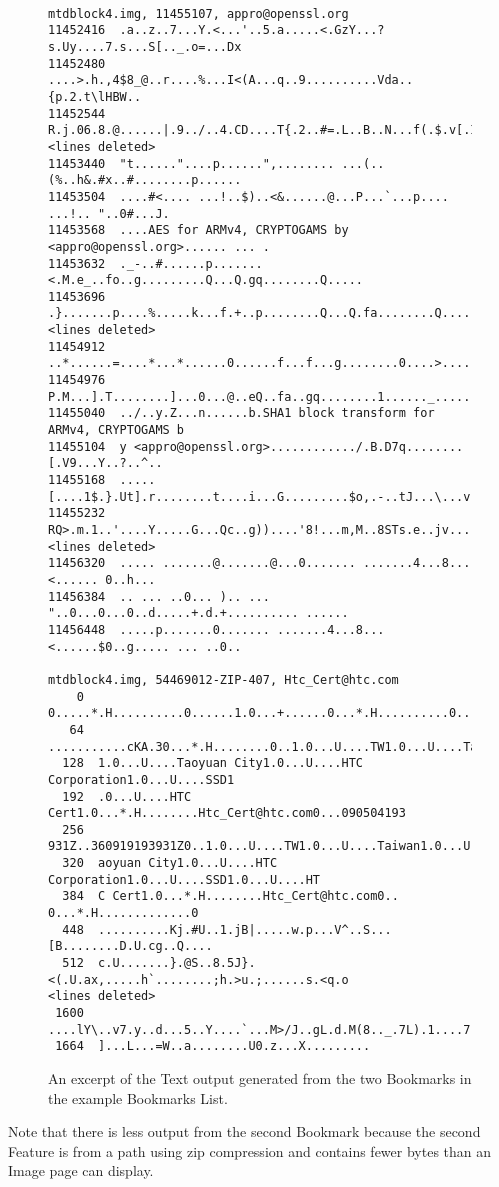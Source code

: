 \documentclass[10pt,twoside]{article}
\begin{document}
\begin{figure}
\small
\begin{verbatim}

mtdblock4.img, 11455107, appro@openssl.org
11452416  .a..z..7...Y.<...'..5.a.....<.GzY...?s.Uy....7.s...S[.._.o=...Dx
11452480  ....>.h.,4$8_@..r....%...I<(A...q..9..........Vda..{p.2.t\lHBW..
11452544  R.j.06.8.@......|.9../..4.CD....T{.2..#=.L..B..N...f(.$.v[.Im..%
<lines deleted>
11453440  "t......"....p......",........ ...(..(%..h&.#x..#........p......
11453504  ....#<.... ...!..$)..<&......@...P...`...p.... ...!.. "..0#...J.
11453568  ....AES for ARMv4, CRYPTOGAMS by <appro@openssl.org>...... ... .
11453632  ._-..#......p.......<.M.e_..fo..g.........Q...Q.gq........Q.....
11453696  .}.......p....%.....k...f.+..p........Q...Q.fa........Q......m..
<lines deleted>
11454912  ..*......=....*...*......0......f...f...g........0....>.....L...
11454976  P.M...].T........]...0...@..eQ..fa..gq........1......_..........
11455040  ../..y.Z...n......b.SHA1 block transform for ARMv4, CRYPTOGAMS b
11455104  y <appro@openssl.org>............/.B.D7q........[.V9...Y..?..^..
11455168  .....[....1$.}.Ut].r........t....i...G.........$o,.-..tJ...\...v
11455232  RQ>.m.1..'....Y.....G...Qc..g))....'8!...m,M..8STs.e..jv.....,r.
<lines deleted>
11456320  ..... .......@.......@...0....... .......4...8...<...... 0..h...
11456384  .. ... ..0... ).. ... "..0...0...0..d.....+.d.+.......... ......
11456448  .....p.......0....... .......4...8...<......$0..g..... ... ..0..

mtdblock4.img, 54469012-ZIP-407, Htc_Cert@htc.com
    0  0.....*.H..........0......1.0...+......0...*.H..........0...0...
   64  ...........cKA.30...*.H........0..1.0...U....TW1.0...U....Taiwan
  128  1.0...U....Taoyuan City1.0...U....HTC Corporation1.0...U....SSD1
  192  .0...U....HTC Cert1.0...*.H........Htc_Cert@htc.com0...090504193
  256  931Z..360919193931Z0..1.0...U....TW1.0...U....Taiwan1.0...U....T
  320  aoyuan City1.0...U....HTC Corporation1.0...U....SSD1.0...U....HT
  384  C Cert1.0...*.H........Htc_Cert@htc.com0.. 0...*.H.............0
  448  ..........Kj.#U..1.jB|.....w.p...V^..S...[B........D.U.cg..Q....
  512  c.U.......}.@S..8.5J}.<(.U.ax,.....h`........;h.>u.;......s.<q.o
<lines deleted>
 1600  ....lY\..v7.y..d...5..Y....`...M>/J..gL.d.M(8.._.7L).1....7./,w6
 1664  ]...L...=W..a........U0.z...X.........
\end{verbatim}
\normalsize
\caption{An excerpt of the Text output generated from the two Bookmarks
in the example Bookmarks List.\label{text-bookmarks}}
\end{figure}
Note that there is less output from the second Bookmark
because the second Feature is from a path using zip compression
and contains fewer bytes than an Image page can display.
\end{document}

